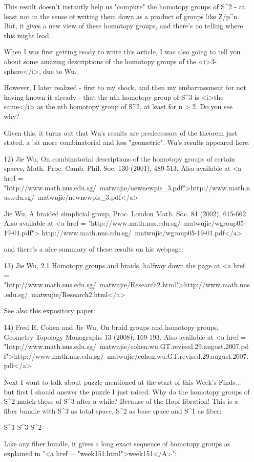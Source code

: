 This result doesn't instantly help us "compute" the homotopy
groups of S^{2} - at least not in the sense of writing them
down as a product of groups like Z/p^{n}.  But, it gives a new view of
these homotopy groups, and there's no telling where this might lead.

When I was first getting ready to write this article, I was also 
going to tell you about some amazing descriptions of the homotopy 
groups of the <i>3-sphere</i>, due to Wu.  

However, I later realized - first to my shock, and then my
embarrassment for not having known it already - that the nth homotopy
group of S^{3} is <i>the same</i> as the nth homotopy group of
S^{2}, at least for n > 2.  Do you see why?

Given this, it turns out that Wu's results are predecessors of the
theorem just stated, a bit more combinatorial and less "geometric".
Wu's results appeared here:

12) Jie Wu, On combinatorial descriptions of the homotopy groups of 
certain spaces, Math. Proc. Camb. Phil. Soc. 130 (2001), 489-513.
Also available at <a href = "http://www.math.nus.edu.sg/~matwujie/newnewpis_3.pdf">http://www.math.nus.edu.sg/~matwujie/newnewpis_3.pdf</a>

Jie Wu, A braided simplicial group, Proc. London Math. Soc. 84 
(2002), 645-662.  Also available at
<a href = "http://www.math.nus.edu.sg/~matwujie/wgroup05-19-01.pdf">
http://www.math.nus.edu.sg/~matwujie/wgroup05-19-01.pdf</a>

and there's a nice summary of these results on his webpage:

13) Jie Wu, 2.1 Homotopy groups and braids, halfway down the page at
<a href = "http://www.math.nus.edu.sg/~matwujie/Research2.html">http://www.math.nus.edu.sg/~matwujie/Research2.html</a>

See also this expository paper:

14) Fred R. Cohen and Jie Wu, On braid groups and homotopy groups, 
Geometry \text{\&}  Topology Monographs 13 (2008), 169-193.  Also available
at
<a href = "http://www.math.nus.edu.sg/~matwujie/cohen.wu.GT.revised.29.august.2007.pdf">http://www.math.nus.edu.sg/~matwujie/cohen.wu.GT.revised.29.august.2007.pdf</a>

Next I want to talk about puzzle mentioned at the start of this Week's
Finds... but first I should answer the puzzle I just raised.  Why do
the homotopy groups of S^{2} match those of S^{3}
after a while?  Because of the Hopf fibration!  This is a fiber bundle
with S^{3} as total space, S^{2} as base space and
S^{1} as fiber:

S^{1} \to  S^{3} \to  S^{2}

Like any fiber bundle, it gives a long exact sequence of homotopy
groups as explained in "<a href = "week151.html">week151</A>":



